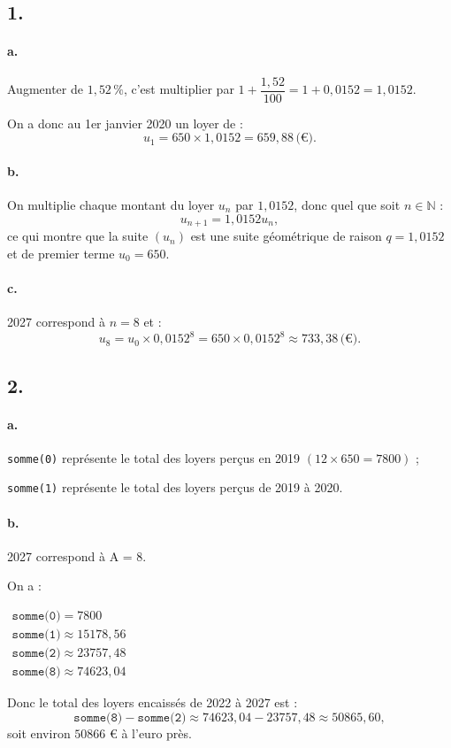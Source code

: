 \subsection*{1.}

\paragraph{a.} Augmenter de \(1{,}52 \, \%\), c'est multiplier par \(1 + \dfrac{1,52}{100} = 1 + 0{,}0152 = 1{,}0152\).

On a donc au 1er janvier 2020 un loyer de :
\[
u_1 = 650 \times 1{,}0152 = 659{,}88 \, \text{(€)}.
\]

\paragraph{b.} On multiplie chaque montant du loyer \( u_n \) par \( 1{,}0152 \), donc quel que soit \( n \in \mathbb{N} \) :
\[
u_{n+1} = 1{,}0152 u_n,
\]
ce qui montre que la suite \( (u_n) \) est une suite géométrique de raison \( q = 1{,}0152 \) et de premier terme \( u_0 = 650 \).

\paragraph{c.} 2027 correspond à \( n = 8 \) et :
\[
u_8 = u_0 \times 0{,}0152^8 = 650 \times 0{,}0152^8 \approx 733{,}38 \, \text{(€)}.
\]

\subsection*{2.}

\paragraph{a.} \texttt{somme(0)} représente le total des loyers perçus en 2019 \( (12 \times 650 = 7800) \) ;

\texttt{somme(1)} représente le total des loyers perçus de 2019 à 2020.

\paragraph{b.} 2027 correspond à A = 8.

On a :

\(\begin{gathered}\texttt{somme(0)} = 7 800 \\
\texttt{somme(1)} \approx 15 178{,}56 \\
\texttt{somme(2)} \approx 23 757{,}48 \\
\texttt{somme(8)} \approx 74 623{,}04\end{gathered}\)

Donc le total des loyers encaissés de 2022 à 2027 est :
\[
\texttt{somme(8)} - \texttt{somme(2)} \approx 74623{,}04 - 23757{,}48 \approx 50865{,}60,
\]
soit environ \(50866\) € à l'euro près.
